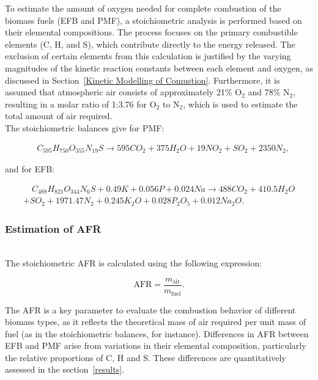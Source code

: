 \documentclass[preprint,12pt]{elsarticle}
\begin{document}
To estimate the amount of oxygen needed for complete combustion of the biomass fuels (EFB and PMF), a stoichiometric analysis is performed based on their elemental compositions. The process focuses on the primary combustible elements (C, H, and S), which contribute directly to the energy released. The exclusion of certain elements from this calculation is justified by the varying magnitudes of the kinetic reaction constants between each element and oxygen, as discussed in Section~\ref{Kinetic Modelling of Comustion}. Furthermore, it is assumed that atmospheric air consists of approximately 21\% O$_2$ and 78\% N$_2$, resulting in a molar ratio of 1:3.76 for O$_2$ to N$_2$, which is used to estimate the total amount of air required.\\


The stoichiometric balances give for PMF: 

\begin{multline}
    \quad C_{595}H_{750}O_{355}N_{19}S \rightarrow 
    595CO_2 + 375H_2O + 19NO_2 + SO_2 + 2350N_2,
\end{multline}

and for EFB:

\begin{multline}
    \quad C_{488}H_{821}O_{344}N_6S + 0.49K + 0.056P + 0.024Na \rightarrow 488CO_2 + 410.5H_2O\\ + SO_2 + 1971.47N_2 + 0.245K_2O + 0.028P_2O_5 + 0.012Na_2O.
\end{multline}


\subsubsection{Estimation of AFR}\\

The stoichiometric AFR is calculated using the following expression:

\begin{equation}
    \text{AFR} = \frac{m_{\text{air}}}{m_{\text{fuel}}}.
\end{equation}

The AFR is a key parameter to evaluate the combustion behavior of different biomass types, as it reflects the theoretical mass of air required per unit mass of fuel (as in the stoichiometric balances, for instance). Differences in AFR between EFB and PMF arise from variations in their elemental composition, particularly the relative proportions of C, H and S. These differences are quantitatively assessed in the section~\ref{results}.
\end{document}

